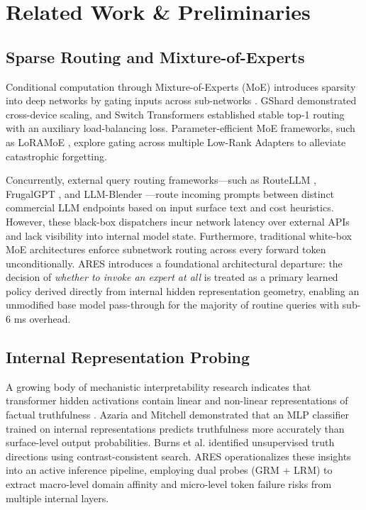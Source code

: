 \documentclass[journal,10pt,twocolumn]{IEEEtran}
\begin{document}
\section{Related Work \& Preliminaries}

\subsection{Sparse Routing and Mixture-of-Experts}
Conditional computation through Mixture-of-Experts (MoE) introduces sparsity into deep networks by gating inputs across sub-networks \cite{shazeer2017moe}. GShard \cite{lepikhin2021gshard} demonstrated cross-device scaling, and Switch Transformers \cite{fedus2022switch} established stable top-1 routing with an auxiliary load-balancing loss. Parameter-efficient MoE frameworks, such as LoRAMoE \cite{dou2023loramoe}, explore gating across multiple Low-Rank Adapters \cite{hu2022lora} to alleviate catastrophic forgetting.

Concurrently, external query routing frameworks---such as RouteLLM \cite{ong2024routellm}, FrugalGPT \cite{chen2023frugalgpt}, and LLM-Blender \cite{jiang2023llmblender}---route incoming prompts between distinct commercial LLM endpoints based on input surface text and cost heuristics. However, these black-box dispatchers incur network latency over external APIs and lack visibility into internal model state. Furthermore, traditional white-box MoE architectures enforce subnetwork routing across every forward token unconditionally. ARES introduces a foundational architectural departure: the decision of \textit{whether to invoke an expert at all} is treated as a primary learned policy derived directly from internal hidden representation geometry, enabling an unmodified base model pass-through for the majority of routine queries with sub-6 ms overhead.

\subsection{Internal Representation Probing}
A growing body of mechanistic interpretability research indicates that transformer hidden activations contain linear and non-linear representations of factual truthfulness \cite{azaria2023internal, burns2023discovering, zou2023representation}. Azaria and Mitchell \cite{azaria2023internal} demonstrated that an MLP classifier trained on internal representations predicts truthfulness more accurately than surface-level output probabilities. Burns et al. \cite{burns2023discovering} identified unsupervised truth directions using contrast-consistent search. ARES operationalizes these insights into an active inference pipeline, employing dual probes (GRM + LRM) to extract macro-level domain affinity and micro-level token failure risks from multiple internal layers.
\end{document}
